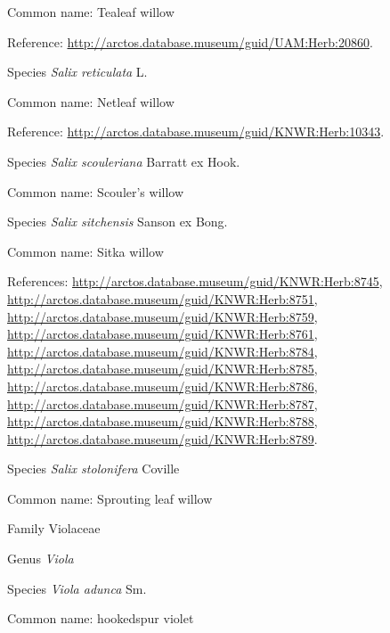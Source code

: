 \documentclass[9pt, article]{memoir}
\begin{document}
\begin{multicols}{2}
Common name: Tealeaf willow

Reference: 
\url{http://arctos.database.museum/guid/UAM:Herb:20860}.

\vspace{6pt}\noindent\hspace{36pt}Species \textit{Salix reticulata} L.


Common name: Netleaf willow

Reference: 
\url{http://arctos.database.museum/guid/KNWR:Herb:10343}.

\vspace{6pt}\noindent\hspace{36pt}Species \textit{Salix scouleriana} Barratt ex Hook.


Common name: Scouler's willow

\vspace{6pt}\noindent\hspace{36pt}Species \textit{Salix sitchensis} Sanson ex Bong.


Common name: Sitka willow

References: 
\url{http://arctos.database.museum/guid/KNWR:Herb:8745}, 
\url{http://arctos.database.museum/guid/KNWR:Herb:8751}, 
\url{http://arctos.database.museum/guid/KNWR:Herb:8759}, 
\url{http://arctos.database.museum/guid/KNWR:Herb:8761}, 
\url{http://arctos.database.museum/guid/KNWR:Herb:8784}, 
\url{http://arctos.database.museum/guid/KNWR:Herb:8785}, 
\url{http://arctos.database.museum/guid/KNWR:Herb:8786}, 
\url{http://arctos.database.museum/guid/KNWR:Herb:8787}, 
\url{http://arctos.database.museum/guid/KNWR:Herb:8788}, 
\url{http://arctos.database.museum/guid/KNWR:Herb:8789}.

\vspace{6pt}\noindent\hspace{36pt}Species \textit{Salix stolonifera} Coville


Common name: Sprouting leaf willow

\vspace{6pt}\noindent\hspace{24pt}Family Violaceae


\vspace{6pt}\noindent\hspace{30pt}Genus \textit{Viola}


\vspace{6pt}\noindent\hspace{36pt}Species \textit{Viola adunca} Sm.


Common name: hookedspur violet


\end{multicols}
\end{document}
